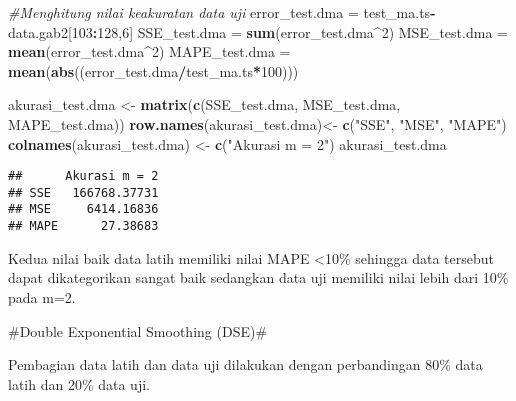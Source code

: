 \documentclass[
]{article}
\newenvironment{Shaded}{\begin{snugshade}}{\end{snugshade}}
\newcommand{\AttributeTok}[1]{\textcolor[rgb]{0.13,0.29,0.53}{#1}}
\newcommand{\CommentTok}[1]{\textcolor[rgb]{0.56,0.35,0.01}{\textit{#1}}}
\newcommand{\DecValTok}[1]{\textcolor[rgb]{0.00,0.00,0.81}{#1}}
\newcommand{\FunctionTok}[1]{\textcolor[rgb]{0.13,0.29,0.53}{\textbf{#1}}}
\newcommand{\NormalTok}[1]{#1}
\newcommand{\OtherTok}[1]{\textcolor[rgb]{0.56,0.35,0.01}{#1}}
\newcommand{\SpecialCharTok}[1]{\textcolor[rgb]{0.81,0.36,0.00}{\textbf{#1}}}
\newcommand{\StringTok}[1]{\textcolor[rgb]{0.31,0.60,0.02}{#1}}
\begin{document}
\begin{Shaded}
\begin{Highlighting}[]
\CommentTok{\#Menghitung nilai keakuratan data uji}
\NormalTok{error\_test.dma }\OtherTok{=}\NormalTok{ test\_ma.ts}\SpecialCharTok{{-}}\NormalTok{data.gab2[}\DecValTok{103}\SpecialCharTok{:}\DecValTok{128}\NormalTok{,}\DecValTok{6}\NormalTok{]}
\NormalTok{SSE\_test.dma }\OtherTok{=} \FunctionTok{sum}\NormalTok{(error\_test.dma}\SpecialCharTok{\^{}}\DecValTok{2}\NormalTok{)}
\NormalTok{MSE\_test.dma }\OtherTok{=} \FunctionTok{mean}\NormalTok{(error\_test.dma}\SpecialCharTok{\^{}}\DecValTok{2}\NormalTok{)}
\NormalTok{MAPE\_test.dma }\OtherTok{=} \FunctionTok{mean}\NormalTok{(}\FunctionTok{abs}\NormalTok{((error\_test.dma}\SpecialCharTok{/}\NormalTok{test\_ma.ts}\SpecialCharTok{*}\DecValTok{100}\NormalTok{)))}

\NormalTok{akurasi\_test.dma }\OtherTok{\textless{}{-}} \FunctionTok{matrix}\NormalTok{(}\FunctionTok{c}\NormalTok{(SSE\_test.dma, MSE\_test.dma, MAPE\_test.dma))}
\FunctionTok{row.names}\NormalTok{(akurasi\_test.dma)}\OtherTok{\textless{}{-}} \FunctionTok{c}\NormalTok{(}\StringTok{"SSE"}\NormalTok{, }\StringTok{"MSE"}\NormalTok{, }\StringTok{"MAPE"}\NormalTok{)}
\FunctionTok{colnames}\NormalTok{(akurasi\_test.dma) }\OtherTok{\textless{}{-}} \FunctionTok{c}\NormalTok{(}\StringTok{"Akurasi m = 2"}\NormalTok{)}
\NormalTok{akurasi\_test.dma}
\end{Highlighting}
\end{Shaded}

\begin{verbatim}
##      Akurasi m = 2
## SSE   166768.37731
## MSE     6414.16836
## MAPE      27.38683
\end{verbatim}

Kedua nilai baik data latih memiliki nilai MAPE \textless10\% sehingga
data tersebut dapat dikategorikan sangat baik sedangkan data uji
memiliki nilai lebih dari 10\% pada m=2.

\#Double Exponential Smoothing (DSE)\#

Pembagian data latih dan data uji dilakukan dengan perbandingan 80\%
data latih dan 20\% data uji.

\begin{Shaded}
\end{Shaded}
\end{document}
